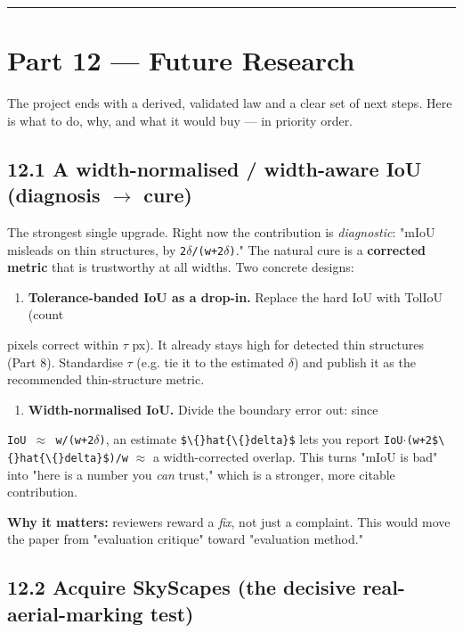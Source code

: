 \documentclass[11pt]{article}
\begin{document}
\vspace{3pt}\hrule\vspace{3pt}
\clearpage\section*{Part 12 --- Future Research}

The project ends with a derived, validated law and a clear set of next steps. Here is what to do, why, and what it would buy --- in priority order.

\subsection*{12.1 A width-normalised / width-aware IoU (diagnosis $\rightarrow$ cure)}

The strongest single upgrade. Right now the contribution is \textit{diagnostic}: "mIoU misleads on thin structures, by \texttt{2$\delta$/(w+2$\delta$)}." The natural cure is a \textbf{corrected metric} that is trustworthy at all widths. Two concrete designs:

\begin{enumerate}\setlength{\itemsep}{1pt}
\item \textbf{Tolerance-banded IoU as a drop-in.} Replace the hard IoU with TolIoU (count
\end{enumerate}
   pixels correct within \texttt{$\tau$} px). It already stays high for detected thin structures    (Part 8). Standardise \texttt{$\tau$} (e.g. tie it to the estimated \texttt{$\delta$}) and publish it as the    recommended thin-structure metric.
\begin{enumerate}\setlength{\itemsep}{1pt}
\item \textbf{Width-normalised IoU.} Divide the boundary error out: since
\end{enumerate}
   \texttt{IoU $\approx$ w/(w+2$\delta$)}, an estimate \texttt{\$\textbackslash\{\}hat\{\textbackslash\{\}delta\}\$} lets you report \texttt{IoU$\cdot$(w+2\$\textbackslash\{\}hat\{\textbackslash\{\}delta\}\$)/w} $\approx$ a    width-corrected overlap. This turns "mIoU is bad" into "here is a number you \textit{can}    trust," which is a stronger, more citable contribution.

\textbf{Why it matters:} reviewers reward a \textit{fix}, not just a complaint. This would move the paper from "evaluation critique" toward "evaluation method."

\subsection*{12.2 Acquire SkyScapes (the decisive real-aerial-marking test)}
\end{document}
